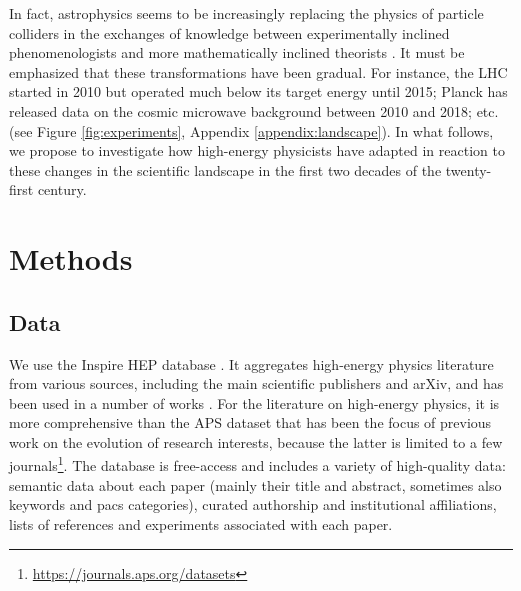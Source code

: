 \documentclass{article}
\begin{document}
In fact, astrophysics seems to be increasingly replacing the physics of particle colliders in the exchanges of knowledge between experimentally inclined phenomenologists and more mathematically inclined theorists \citep{Gautheron2023}. It must be emphasized that these transformations have been gradual. For instance, the LHC started in 2010 but operated much below its target energy until 2015; Planck has released data on the cosmic microwave background between 2010 and 2018; etc. (see Figure \ref{fig:experiments}, Appendix \ref{appendix:landscape}). In what follows, we propose to investigate how high-energy physicists have adapted in reaction to these changes in the scientific landscape in the first two decades of the twenty-first century.%


\section{\label{sec:methods}Methods}

\subsection{\label{sec:data}Data}

We use the Inspire HEP database \citep{InspireAPI}. It aggregates high-energy physics literature from various sources, including the main scientific publishers and arXiv, and has been used in a number of works \citep{Perovi2016,Chall2019a,Strumia2021,Sikimi2022,Gautheron2023}. For the literature on high-energy physics, it is more comprehensive than the APS dataset that has been the focus of previous work on the evolution of research interests, because the latter is limited to a few journals\footnote{\url{https://journals.aps.org/datasets}}. The database is free-access and includes a variety of high-quality data: semantic data about each paper (mainly their title and abstract, sometimes also keywords and \gls{pacs} categories), curated authorship and institutional affiliations, lists of references and experiments associated with each paper. %
\end{document}
